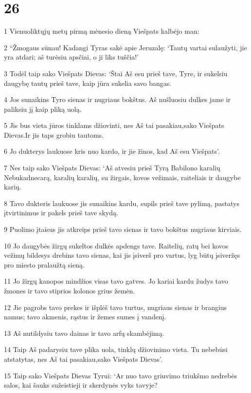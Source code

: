 \chapter{26}


\par 1 Vienuoliktųjų metų pirmą mėnesio dieną Viešpats kalbėjo man: 
\par 2 “Žmogaus sūnau! Kadangi Tyras sakė apie Jeruzalę: ‘Tautų vartai sulaužyti, jie yra atdari; aš turėsiu apsčiai, o ji liks tuščia!’ 
\par 3 Todėl taip sako Viešpats Dievas: ‘Štai Aš esu prieš tave, Tyre, ir sukelsiu daugybę tautų prieš tave, kaip jūra sukelia savo bangas. 
\par 4 Jos sunaikins Tyro sienas ir nugriaus bokštus. Aš nušluosiu dulkes jame ir paliksiu jį kaip pliką uolą. 
\par 5 Jis bus vieta jūros tinklams džiovinti, nes Aš tai pasakiau,­sako Viešpats Dievas.­Ir jis taps grobiu tautoms. 
\par 6 Jo dukterys laukuose kris nuo kardo, ir jie žinos, kad Aš esu Viešpats’. 
\par 7 Nes taip sako Viešpats Dievas: ‘Aš atvesiu prieš Tyrą Babilono karalių Nebukadnecarą, karalių karalių, su žirgais, kovos vežimais, raiteliais ir daugybe karių. 
\par 8 Tavo dukteris laukuose jis sunaikins kardu, supils prieš tave pylimą, pastatys įtvirtinimus ir pakels prieš tave skydą. 
\par 9 Puolimo įtaisus jis atkreips prieš tavo sienas ir tavo bokštus nugriaus kirviais. 
\par 10 Jo daugybės žirgų sukeltos dulkės apdengs tave. Raitelių, ratų bei kovos vežimų bildesys drebins tavo sienas, kai jis įsiverš pro vartus, lyg būtų įsiveržęs pro miesto pralaužtą sieną. 
\par 11 Jo žirgų kanopos mindžios visas tavo gatves. Jo kariai kardu žudys tavo žmones ir tavo stiprios kolonos grius žemėn. 
\par 12 Jie pagrobs tavo prekes ir išplėš tavo turtus, nugriaus sienas ir brangius namus; tavo akmenis, rąstus ir žemes sumes į vandenį. 
\par 13 Aš nutildysiu tavo dainas ir tavo arfų skambėjimą. 
\par 14 Taip Aš padarysiu tave plika uola, tinklų džiovinimo vieta. Tu nebebūsi atstatytas, nes Aš tai pasakiau,­sako Viešpats Dievas’. 
\par 15 Taip sako Viešpats Dievas Tyrui: ‘Ar nuo tavo griuvimo triukšmo nedrebės salos, kai šauks sužeistieji ir skerdynės vyks tavyje? 
